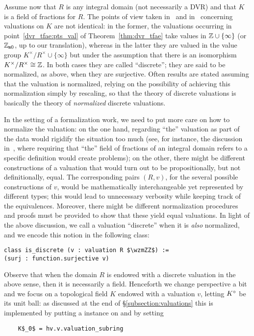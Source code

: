 \documentclass[sigplan,10pt,anonymous,review]{acmart}
\begin{document}
Assume now that $R$ is any integral domain (not necessarily a DVR) and that $K$ is a field of fractions for $R$. The points of view taken in~\cite[Chapitre~I]{Ser62} and in~\cite[Chapitre~VI, \S3, n$^\circ$6]{Bou85} concerning valuations on $K$ are not identical: in the former, the valuations occurring in point~\ref{dvr_tfae:pts_val} of Theorem~\ref{thm:dvr_tfae} take values in $\mathbb{Z}\cup\{\infty\}$ (or $\mathbb{Z}_{\mathtt{m}0}$, up to our translation), whereas in the latter they are valued in the value group $K^\times/R^\times \cup\{\infty\}$ but under the assumption that there is an isomorphism $K^\times/R^\times\cong \mathbb{Z}$. In both cases they are called ``discrete''; they are said to be normalized, as above, when they are surjective. Often results are stated assuming that the valuation is normalized, relying on the possibility of achieving this normalization simply by rescaling, so that the theory of discrete valuations is basically the theory of \emph{normalized} discrete valuations.

In the setting of a formalization work, we need to put more care on how to normalize the valuation: on the one hand, regarding ``the'' valuation as part of the data would rigidify the situation too much (see, for instance, the discussion in~\cite[\S4.5]{BaaDahNarNuc22}, where requiring that ``the'' field of fractions of an integral domain refers to a specific definition would create problems); on the other, there might be different constructions of a valuation that would turn out to be propositionally, but not definitionally, equal. The corresponding pairs $(R,v)$, for the several possible constructions of $v$, would be mathematically interchangeable yet represented by different types; this would lead to unnecessary verbosity while keeping track of the equivalences. Moreover, there might be different normalization procedures and proofs must be provided to show that these yield equal valuations. In light of the above discussion, we call a valuation ``discrete'' when it is \emph{also} normalized, and we encode this notion in the following class\href{https://github.com/LCFT-Lean/local_fields/blob/76ad487d09babdb0018f394a5634526637ee014a/src/discrete_valuation_ring/basic.lean#L125}{\extlink}:
\begin{lstlisting}[caption={Definition of discrete valuation}, label={code:def_discrete}]
class is_discrete (v : valuation R $\wzmZZ$) := 
(surj : function.surjective v)
\end{lstlisting}

Observe that when the domain $R$ is endowed with a discrete valuation in the above sense, then it is necessarily a field. Henceforth we change perspective a bit and we focus on a topological field $K$ endowed with a valuation $v$, letting ${K}^\circ$ be its unit ball: as discussed at the end of \S\ref{subsection:valuations} this is implemented by putting a  instance  on  and by setting 
\begin{lstlisting}
    K$_0$ = hv.v.valuation_subring
\end{lstlisting}
\end{document}
